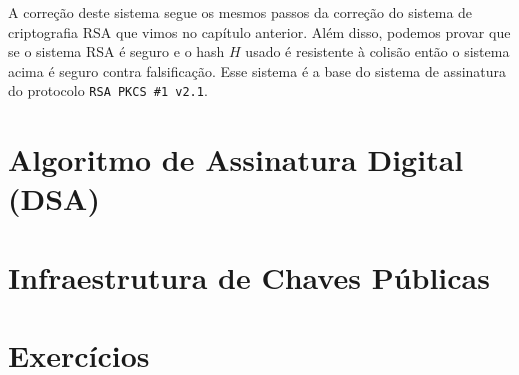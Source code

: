 A correção deste sistema segue os mesmos passos da correção do sistema de criptografia RSA que vimos no capítulo anterior.
Além disso, podemos provar que se o sistema RSA é seguro e o hash $H$ usado é resistente à colisão então o sistema acima é seguro contra falsificação.
Esse sistema é a base do sistema de assinatura do protocolo {\tt RSA PKCS \#1 v2.1}.

\section{Algoritmo de Assinatura Digital (DSA)}
\label{sec:dsa}


\section{Infraestrutura de Chaves Públicas}
\label{sec:pki}


\section{Exercícios}
\label{sec:exercicios}




